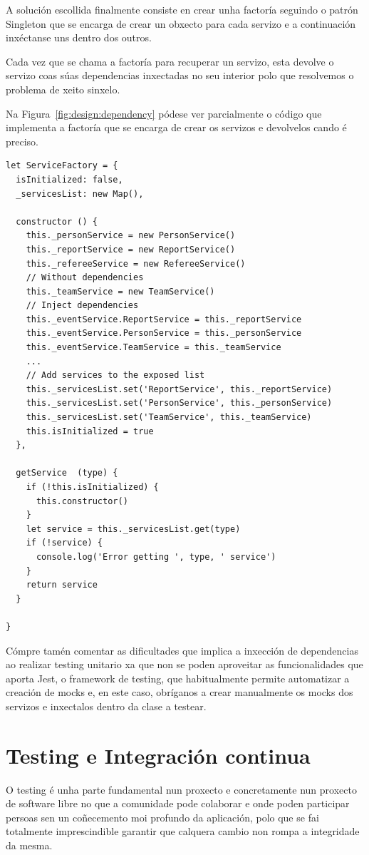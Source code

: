   A solución escollida finalmente consiste en crear unha factoría seguindo o 
patrón Singleton\cite{book:patterns} que se encarga de crear un obxecto para 
cada servizo e a continuación inxéctanse uns dentro dos outros.

  Cada vez que se chama a factoría para recuperar un servizo, esta
devolve o servizo coas súas dependencias inxectadas no seu interior polo que 
resolvemos o problema de xeito sinxelo.

  Na Figura~\ref{fig:design:dependency} pódese ver parcialmente o código que 
implementa a factoría que se encarga de crear os servizos e devolvelos cando é 
preciso.

    \lstset{}
    \begin{lstlisting}[caption=Fragmento da ServiceFactory., 
label=fig:design:dependency]
let ServiceFactory = {
  isInitialized: false,
  _servicesList: new Map(),

  constructor () {
    this._personService = new PersonService()
    this._reportService = new ReportService()
    this._refereeService = new RefereeService()
    // Without dependencies
    this._teamService = new TeamService()
    // Inject dependencies
    this._eventService.ReportService = this._reportService
    this._eventService.PersonService = this._personService
    this._eventService.TeamService = this._teamService
    ...
    // Add services to the exposed list
    this._servicesList.set('ReportService', this._reportService)
    this._servicesList.set('PersonService', this._personService)
    this._servicesList.set('TeamService', this._teamService)
    this.isInitialized = true
  },

  getService  (type) {
    if (!this.isInitialized) {
      this.constructor()
    }
    let service = this._servicesList.get(type)
    if (!service) {
      console.log('Error getting ', type, ' service')
    }
    return service
  }

}
    \end{lstlisting}

  Cómpre tamén comentar as dificultades que implica a inxección de dependencias 
ao realizar testing unitario xa que non se poden aproveitar as funcionalidades 
que aporta Jest, o framework de testing, que habitualmente permite automatizar 
a creación de mocks e, en este caso, obríganos a crear manualmente os mocks dos 
servizos e inxectalos dentro da clase a testear.

  \section{Testing e Integración continua}
  O testing é unha parte fundamental nun proxecto e concretamente nun proxecto 
de software libre no que a comunidade pode colaborar e onde poden 
participar persoas sen un coñecemento moi profundo da aplicación, polo que se 
fai totalmente imprescindible garantir que calquera cambio non rompa a 
integridade da mesma.

